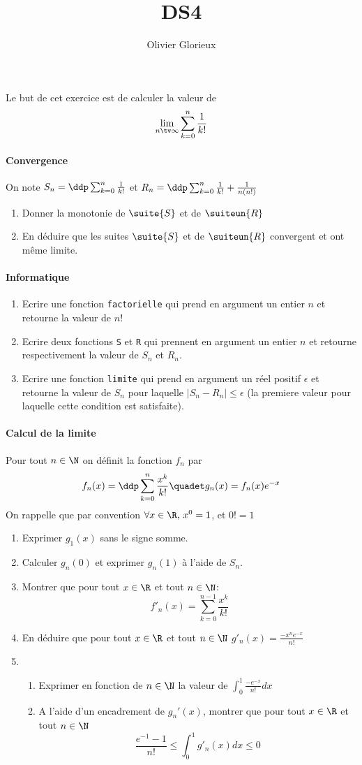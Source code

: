 \documentclass[a4paper, 11pt,reqno]{article}
\author{Olivier Glorieux}
\begin{document}
\title{DS4
}

\begin{exercice}


Le but de cet exercice est de calculer la valeur de 
$$\lim_{n\tv \infty} \sum_{k=0}^n \frac{1}{k!}$$

\paragraph{Convergence}
On note $S_n=\ddp   \sum_{k=0}^n \frac{1}{k!}$ et $R_n=\ddp \sum_{k=0}^n \frac{1}{k!} +\frac{1}{n(n!)}$
\begin{enumerate}
\item Donner la monotonie de $\suite{S}$ et de $\suiteun{R}$
\item En déduire que les suites $\suite{S}$ et de $\suiteun{R}$ convergent et ont même limite. 
\end{enumerate}

\paragraph{Informatique}
\begin{enumerate}
\item Ecrire une fonction \texttt{factorielle} qui prend en argument un entier $n$ et retourne la valeur de $n!$
\item Ecrire deux fonctions \texttt{S} et \texttt{R} qui prennent en argument un entier $n$ et retourne respectivement la valeur de $S_n$ et $R_n$. 
\item Ecrire une fonction \texttt{limite} qui prend en argument un réel positif $\epsilon$ et  retourne la valeur de $S_n$ pour laquelle $|S_n -R_n|\leq \epsilon$ (la premiere valeur pour laquelle cette condition est satisfaite).
\end{enumerate}


\paragraph{Calcul de la limite}
Pour tout $n\in \N$ on définit la fonction $f_n$ par 
$$f_n(x)  = \ddp \sum_{k=0}^n \frac{x^k}{k!} \quadet g_n(x) =f_n(x)e^{-x}$$
On rappelle que par convention $\forall x \in \R, \, x^0 =1$, et $0!=1$
\begin{enumerate}
\item Exprimer $g_1(x)$ sans le signe somme. 
\item Calculer $g_n(0)$ et exprimer $g_n(1)$ à l'aide de $S_n$. 
\item Montrer que pour tout $x\in \R$ et tout $n\in \N$: $$f'_n(x) = \sum_{k=0}^{n-1} \frac{x^k}{k!}$$
\item En déduire que  pour tout $x\in \R$ et tout $n\in \N$ $g'_n(x)= \frac{-x^ne^{-x}}{n!}$
\item  \begin{enumerate}
\item Exprimer en fonction de $n\in \N$ la valeur de  $\int_0^1 \frac{-e^{-x}}{n!}dx$
\item A l'aide d'un encadrement de $g_n'(x)$, montrer que pour tout $x\in \R$ et tout $n\in \N$ $$ \frac{e^{-1}-1}{n!}\leq \int_0^1 g'_n(x) dx\leq 0$$
\end{enumerate}



\end{enumerate}
\end{exercice}
\end{document}
